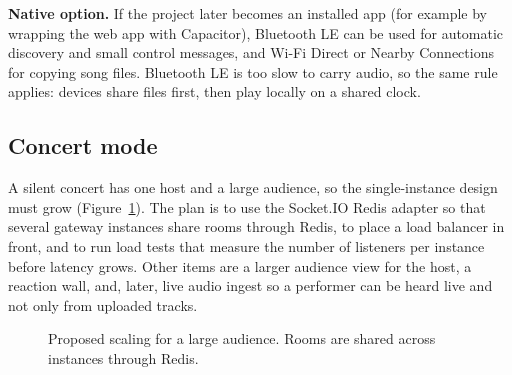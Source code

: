 \documentclass[11pt,a4paper]{article}
\begin{document}
\textbf{Native option.} If the project later becomes an installed app (for example by
wrapping the web app with Capacitor), Bluetooth LE can be used for automatic discovery and
small control messages, and Wi-Fi Direct or Nearby Connections for copying song files.
Bluetooth LE is too slow to carry audio, so the same rule applies: devices share files
first, then play locally on a shared clock.

\subsection{Concert mode}
A silent concert has one host and a large audience, so the single-instance design must grow
(Figure~\ref{fig:concert}). The plan is to use the Socket.IO Redis adapter so that several
gateway instances share rooms through Redis, to place a load balancer in front, and to run
load tests that measure the number of listeners per instance before latency grows. Other
items are a larger audience view for the host, a reaction wall, and, later, live audio
ingest so a performer can be heard live and not only from uploaded tracks.

\begin{figure}[htbp]
\centering
{}
\caption{Proposed scaling for a large audience. Rooms are shared across instances through Redis.}
\label{fig:concert}
\end{figure}
\end{document}
